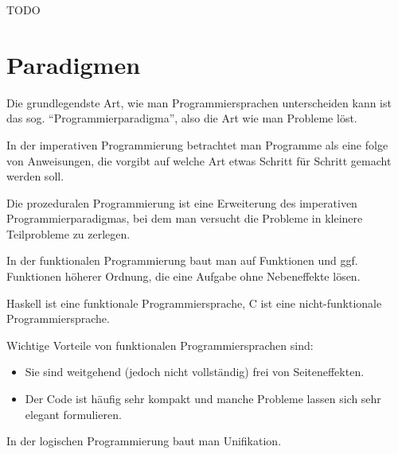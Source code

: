 \begin{beispiel}[Assembler]%
    TODO
\end{beispiel}

\section{Paradigmen}
Die grundlegendste Art, wie man Programmiersprachen unterscheiden
kann ist das sog. \enquote{Programmierparadigma}, also die Art wie
man Probleme löst.

\begin{definition}
    In der imperativen Programmierung betrachtet man Programme als
    eine folge von Anweisungen, die vorgibt auf welche Art etwas 
    Schritt für Schritt gemacht werden soll.
\end{definition}

\begin{definition}
    Die prozeduralen Programmierung ist eine Erweiterung des imperativen
    Programmierparadigmas, bei dem man versucht die Probleme in 
    kleinere Teilprobleme zu zerlegen.
\end{definition}

\begin{definition}
    In der funktionalen Programmierung baut man auf Funktionen und
    ggf. Funktionen höherer Ordnung, die eine Aufgabe ohne Nebeneffekte
    lösen.
\end{definition}

Haskell ist eine funktionale Programmiersprache, C ist eine
nicht-funktionale Programmiersprache.

Wichtige Vorteile von funktionalen Programmiersprachen sind:
\begin{itemize}
    \item Sie sind weitgehend (jedoch nicht vollständig) frei von Seiteneffekten.
    \item Der Code ist häufig sehr kompakt und manche Probleme lassen
          sich sehr elegant formulieren.
\end{itemize}

\begin{definition}
    In der logischen Programmierung baut man Unifikation.
\end{definition}

